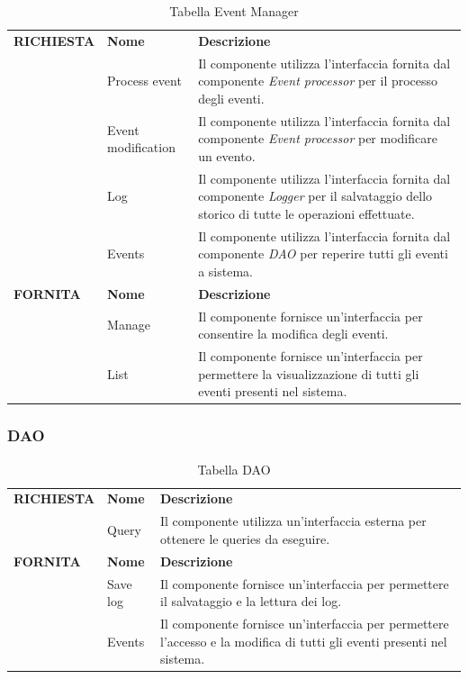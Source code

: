 \documentclass{article}
\begin{document}
\begin{table}[htbp]
    \centering
    \renewcommand{\arraystretch}{1.3} %
    \begin{tabularx}{\textwidth}{| l | l | X |}
        \Xhline{2pt}
        \textbf{RICHIESTA} & \textbf{Nome} & \textbf{Descrizione} \\
        \Xhline{2pt}
         & Process event & Il componente utilizza l'interfaccia fornita dal componente \textit{Event processor} per il processo degli eventi. \\
        \hline
         & Event modification & Il componente utilizza l'interfaccia fornita dal componente \textit{Event processor} per modificare un evento. \\
        \hline
         & Log & Il componente utilizza l'interfaccia fornita dal componente \textit{Logger} per il salvataggio dello storico di tutte le operazioni effettuate. \\
        \hline
         & Events & Il componente utilizza l'interfaccia fornita dal componente \textit{DAO} per reperire tutti gli eventi a sistema. \\
        \Xhline{2pt}
        \textbf{FORNITA} & \textbf{Nome} & \textbf{Descrizione} \\
        \Xhline{2pt}
         & Manage & Il componente fornisce un'interfaccia per consentire la modifica degli eventi. \\
        \hline
         & List & Il componente fornisce un'interfaccia per permettere la visualizzazione di tutti gli eventi presenti nel sistema. \\
        \hline
    \end{tabularx}
    \caption{Tabella Event Manager}
\end{table}

\subsubsection{DAO}

\begin{table}[htbp]
    \centering
    \renewcommand{\arraystretch}{1.3} %
    \begin{tabularx}{\textwidth}{| l | l | X |}
        \Xhline{2pt}
        \textbf{RICHIESTA} & \textbf{Nome} & \textbf{Descrizione} \\
        \Xhline{2pt}
         & Query & Il componente utilizza un'interfaccia esterna per ottenere le queries da eseguire. \\
        \Xhline{2pt}
        \textbf{FORNITA} & \textbf{Nome} & \textbf{Descrizione} \\
        \Xhline{2pt}
         & Save log & Il componente fornisce un'interfaccia per permettere il salvataggio e la lettura dei log. \\
        \hline
         & Events & Il componente fornisce un'interfaccia per permettere l'accesso e la modifica di tutti gli eventi presenti nel sistema. \\
        \hline
    \end{tabularx}
    \caption{Tabella DAO}
\end{table}
\end{document}
